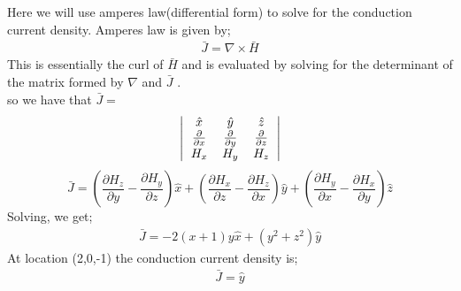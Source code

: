 \begin{exmp}
	Here we will use amperes law(differential form) to solve for the conduction current density. Amperes law is given by;
	\begin{align*}
			\bar{J}=\nabla\times\bar{H}
		\end{align*}
	This is essentially the curl of $\bar{H}$ and is evaluated by solving for the determinant of the matrix formed by $\nabla$ and $\bar{J}$ .\\
	so we have that $\bar{J} =$
	\[
	\left|
	\begin{tabular}{c c c}
			$\hat{x}$ & $\hat{y}$ & $\hat{z}$\\
			$\frac{\partial}{\partial x}$ & $\frac{\partial}{\partial y}$ & $\frac{\partial}{\partial z}$\\
			$H_{x}$ & $H_{y}$ & $H_{z}$
		\end{tabular}
	\right|
	\]
	\begin{dmath*}
			\bar{J}= (\frac{\partial H_{z}}{\partial y}-\frac{\partial H_{y}}{\partial z})\hat{x}+ (\frac{\partial H_{x}}{\partial z}-\frac{\partial H_{z}}{\partial x})\hat{y}+ (\frac{\partial H_{y}}{\partial x}-\frac{\partial H_{x}}{\partial y})\hat{z}
		\end{dmath*}
	Solving, we get;
	\begin{align*}
			\bar{J}=-2(x+1)y\hat{x}+(y^{2}+z^{2})\hat{y}
		\end{align*}
	At location (2,0,-1) the conduction current density is;
	\begin{align*}
			\bar{J}=\hat{y}
		\end{align*}
	

\end{exmp}
